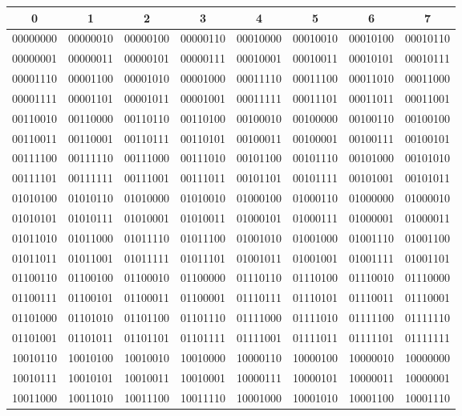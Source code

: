 \documentclass[10pt,a4paper,onecolumn]{article}
\begin{document}
\begin{tabular}{|c|c|c|c|c|c|c|c|}
\hline
\bf 0 & \bf 1 & \bf 2 & \bf 3 & \bf 4 & \bf 5 & \bf 6 & \bf 7 \\ \hline
00000000 & 00000010 & 00000100 & 00000110 & 00010000 & 00010010 & 00010100 & 00010110 \\
00000001 & 00000011 & 00000101 & 00000111 & 00010001 & 00010011 & 00010101 & 00010111 \\
00001110 & 00001100 & 00001010 & 00001000 & 00011110 & 00011100 & 00011010 & 00011000 \\
00001111 & 00001101 & 00001011 & 00001001 & 00011111 & 00011101 & 00011011 & 00011001 \\
00110010 & 00110000 & 00110110 & 00110100 & 00100010 & 00100000 & 00100110 & 00100100 \\
00110011 & 00110001 & 00110111 & 00110101 & 00100011 & 00100001 & 00100111 & 00100101 \\
00111100 & 00111110 & 00111000 & 00111010 & 00101100 & 00101110 & 00101000 & 00101010 \\
00111101 & 00111111 & 00111001 & 00111011 & 00101101 & 00101111 & 00101001 & 00101011 \\
01010100 & 01010110 & 01010000 & 01010010 & 01000100 & 01000110 & 01000000 & 01000010 \\
01010101 & 01010111 & 01010001 & 01010011 & 01000101 & 01000111 & 01000001 & 01000011 \\
01011010 & 01011000 & 01011110 & 01011100 & 01001010 & 01001000 & 01001110 & 01001100 \\
01011011 & 01011001 & 01011111 & 01011101 & 01001011 & 01001001 & 01001111 & 01001101 \\
01100110 & 01100100 & 01100010 & 01100000 & 01110110 & 01110100 & 01110010 & 01110000 \\
01100111 & 01100101 & 01100011 & 01100001 & 01110111 & 01110101 & 01110011 & 01110001 \\
01101000 & 01101010 & 01101100 & 01101110 & 01111000 & 01111010 & 01111100 & 01111110 \\
01101001 & 01101011 & 01101101 & 01101111 & 01111001 & 01111011 & 01111101 & 01111111 \\
10010110 & 10010100 & 10010010 & 10010000 & 10000110 & 10000100 & 10000010 & 10000000 \\
10010111 & 10010101 & 10010011 & 10010001 & 10000111 & 10000101 & 10000011 & 10000001 \\
10011000 & 10011010 & 10011100 & 10011110 & 10001000 & 10001010 & 10001100 & 10001110 \\

\end{tabular}
\end{document}
